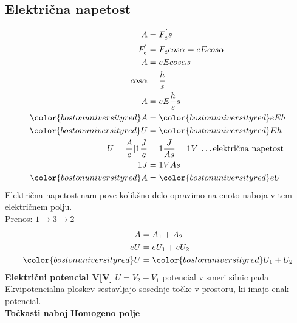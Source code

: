 {\color{indiagreen}\subsection{Električna napetost}}
\begin{align*}
	A &= F^{'}_e s\\
	F^{'}_e &= F_e cos\alpha = e E cos\alpha\\
	A &= e E cos\alpha s\\
	cos\alpha &= \frac{h}{s}\\
	A &= e E \frac{h}{s} s\\
	{\color{bostonuniversityred}A} &= {\color{bostonuniversityred}e E h}\\
	{\color{bostonuniversityred}U} &= {\color{bostonuniversityred}E h}\\
	U = \frac{A}{e}[1\frac{J}{c} &= 1\frac{J}{As} = 1V] \dots \text{električna napetost}\\
	1J &= 1 VAs\\ 
	{\color{bostonuniversityred}A} &= {\color{bostonuniversityred}e U}\\
\end{align*}
Električna napetost nam pove kolikšno delo opravimo na enoto naboja v tem električnem polju.\\
Prenos: $1 \rightarrow 3 \rightarrow 2$
\begin{align*}
	A &= A_1 + A_2\\
	eU &= eU_1 + eU_2\\
	{\color{bostonuniversityred}U} &= {\color{bostonuniversityred}U_1 + U_2}\\ 
\end{align*}
\textbf{Električni potencial V[V]}
$U = V_2 - V_1$ potencial v smeri silnic pada
{\color{bostonuniversityred} Ekvipotencialna ploskev} sestavljajo sosednje točke v prostoru, ki imajo enak potencial.\\
\textbf{Točkasti naboj}
\textbf{Homogeno polje}
